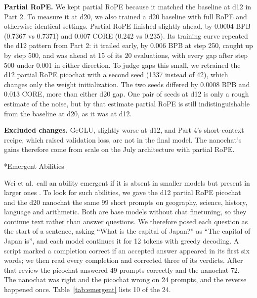 \documentclass[11pt]{article}
\makeatletter
\renewcommand\subsection{\@startsection{subsection}{2}{\z@}{0.6em}{0.2em}{\normalsize\bfseries}}
\makeatother
\begin{document}
\textbf{Partial RoPE.} We kept partial RoPE because it matched the baseline at d12 in Part 2. To measure it at d20, we also trained a d20 baseline with full RoPE and otherwise identical settings. Partial RoPE finished slightly ahead, by 0.0004 BPB (0.7367 vs 0.7371) and 0.007 CORE (0.242 vs 0.235). Its training curve repeated the d12 pattern from Part 2: it trailed early, by 0.006 BPB at step 250, caught up by step 500, and was ahead at 15 of its 20 evaluations, with every gap after step 500 under 0.001 in either direction. To judge gaps this small, we retrained the d12 partial RoPE picochat with a second seed (1337 instead of 42), which changes only the weight initialization. The two seeds differed by 0.0008 BPB and 0.013 CORE, more than either d20 gap. One pair of seeds at d12 is only a rough estimate of the noise, but by that estimate partial RoPE is still indistinguishable from the baseline at d20, as it was at d12.

\textbf{Excluded changes.} GeGLU, slightly worse at d12, and Part 4's short-context recipe, which raised validation loss, are not in the final model. The nanochat's gains therefore come from scale on the July architecture with partial RoPE.

\subsection*{Emergent Abilities}

Wei et al.\ call an ability emergent if it is absent in smaller models but present in larger ones \cite{wei-emergent}. To look for such abilities, we gave the d12 partial RoPE picochat and the d20 nanochat the same 99 short prompts on geography, science, history, language and arithmetic. Both are base models without chat finetuning, so they continue text rather than answer questions. We therefore posed each question as the start of a sentence, asking ``What is the capital of Japan?'' as ``The capital of Japan is'', and each model continues it for 12 tokens with greedy decoding. A script marked a completion correct if an accepted answer appeared in its first six words; we then read every completion and corrected three of its verdicts. After that review the picochat answered 49 prompts correctly and the nanochat 72. The nanochat was right and the picochat wrong on 24 prompts, and the reverse happened once. Table~\ref{tab:emergent} lists 10 of the 24.
\end{document}
